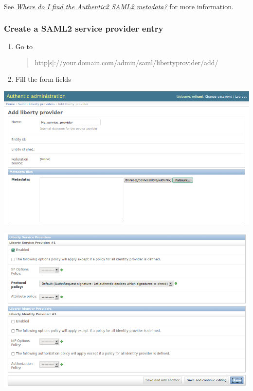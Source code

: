 \documentclass[letterpaper,10pt,english]{sphinxmanual}
\begin{document}
See {\hyperref[where_metadata:where-metadata]{\emph{Where do I find the Authentic2 SAML2 metadata?}}} for more information.


\subsubsection{Create a SAML2 service provider entry}
\label{config_saml2_sp:create-a-saml2-service-provider-entry}\begin{enumerate}
\item {} 
Go to
\begin{quote}

http{[}s{]}://your.domain.com/admin/saml/libertyprovider/add/
\end{quote}

\item {} 
Fill the form fields

\end{enumerate}

\includegraphics{new_saml2_sp_1.png}

\includegraphics{new_saml2_sp_2.png}
\end{document}
